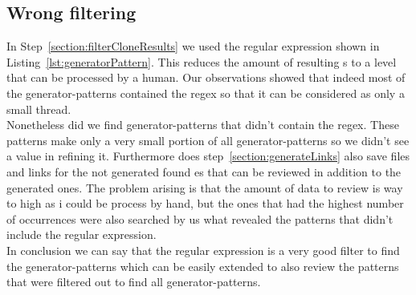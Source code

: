 \subsection{Wrong filtering}
In Step~\ref{section:filterCloneResults} we used the regular expression shown in Listing~\ref{lst:generatorPattern}. This reduces the amount of resulting s to a level that can be processed by a human. Our observations showed that indeed most of the generator-patterns contained the regex so that it can be considered as only a small thread.\\
Nonetheless did we find generator-patterns that didn't contain the regex. These patterns make only a very small portion of all generator-patterns so we didn't see a value in refining it. Furthermore does step~\ref{section:generateLinks} also save files and links for the not generated found es that can be reviewed in addition to the generated ones. The problem arising is that the amount of data to review is way to high as i could be process by hand, but the ones that had the highest number of occurrences were also searched by us what revealed the patterns that didn't include the regular expression.\\
In conclusion we can say that the regular expression is a very good filter to find the generator-patterns which can be easily extended to also review the patterns that were filtered out to find all generator-patterns.

